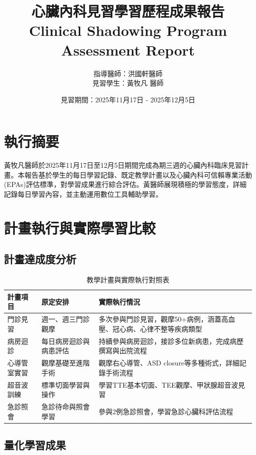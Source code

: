 \documentclass[12pt,a4paper]{article}
\title{\Large \textbf{心臟內科見習學習歷程成果報告}\\
\large Clinical Shadowing Program Assessment Report}
\author{指導醫師：洪國軒醫師\\
見習學生：黃牧凡 醫師}
\date{見習期間：2025年11月17日 - 2025年12月5日}
\begin{document}
\maketitle

\section{執行摘要}

黃牧凡醫師於2025年11月17日至12月5日期間完成為期三週的心臟內科臨床見習計畫。本報告基於學生的每日學習記錄、既定教學計畫以及心臟內科可信賴專業活動(EPAs)評估標準，對學習成果進行綜合評估。黃醫師展現積極的學習態度，詳細記錄每日學習內容，並主動運用數位工具輔助學習。

\section{計畫執行與實際學習比較}

\subsection{計畫達成度分析}

\begin{table}[h]
\centering
\caption{教學計畫與實際執行對照表}
\begin{tabular}{|p{3cm}|p{5cm}|p{6cm}|}
\hline
\textbf{計畫項目} & \textbf{原定安排} & \textbf{實際執行情況} \\
\hline
門診見習 & 週一、週三門診觀摩 & 多次參與門診見習，觀摩50+病例，涵蓋高血壓、冠心病、心律不整等疾病類型 \\
\hline
病房迴診 & 每日病房迴診與病患評估 & 持續參與病房迴診，接診多位新病患，完成病歷撰寫與出院流程 \\
\hline
心導管室實習 & 觀摩基礎至進階手術 & 觀摩右心導管、ASD closure等多種術式，詳細記錄手術流程 \\
\hline
超音波訓練 & 標準切面學習與操作 & 學習TTE基本切面、TEE觀摩、甲狀腺超音波見習 \\
\hline
急診照會 & 急診待命與照會學習 & 參與2例急診照會，學習急診心臟科評估流程 \\
\hline
\end{tabular}
\end{table}

\subsection{量化學習成果}
\end{document}
